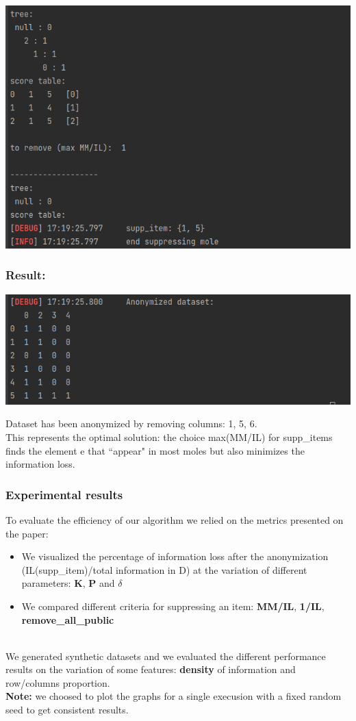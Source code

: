 \documentclass{beamer}
\begin{document}
\begin{frame}[fragile]
\frametitle{ }
\includegraphics[scale=0.4]{test/part2_2}
\end{frame}
\begin{frame}[fragile]
\frametitle{Result:}
\includegraphics[scale=0.4]{test/result}

\vspace{0.5cm}
Dataset has been anonymized by removing columns: 1, 5, 6.\\
This represents the optimal solution: the choice max(MM/IL) for supp\_items finds the element e that ``appear" in most moles but also minimizes the information loss. 
\end{frame}
\begin{frame}[fragile]
\frametitle{Experimental results}
To evaluate the efficiency of our algorithm we relied on the metrics presented on the paper:
\begin{itemize}
    \item We visualized the percentage of information loss after the anonymization (IL(supp\_item)/total information in D) at the variation of different parameters: \textbf{K}, \textbf{P} and \textbf{$\delta$}
    \item We compared different criteria for suppressing an item: \textbf{MM/IL}, \textbf{1/IL}, \textbf{remove\_all\_public}
\end{itemize}\\
\vspace{4mm}
We generated synthetic datasets and we evaluated the different performance results on the variation of some features: \textbf{density} of information and row/columns proportion.\\

\textbf{Note:} we choosed to plot the graphs for a single execusion with a fixed random seed to get consistent results.
\end{frame}
\end{document}
